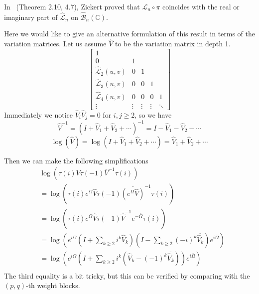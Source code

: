 In~\cite{Zickert_HolomorphicPolylogarithmsAndBlochComplexes} (Theorem 2.10, 4.7), Zickert proved that $\mathcal L_{n}\circ\pi$ coincides with the real or imaginary part of $\widehat{\mathcal L}_n$ on $\widehat{\mathcal B}_n(\mathbb C)$.

Here we would like to give an alternative formulation of this result in terms of the variation matrices. Let us assume $\widehat V$ to be the variation matrix in depth 1.
\begin{equation}
\begin{bmatrix}
1\\
0&1\\
\widehat{\mathcal L}_2(u,v)&0&1\\
\widehat{\mathcal L}_3(u,v)&0&0&1\\
\widehat{\mathcal L}_4(u,v)&0&0&0&1\\
\vdots&\vdots&\vdots&\vdots&\ddots
\end{bmatrix}
\end{equation}
Immediately we notice $\widehat V_i\widehat V_j=0$ for $i,j\geq2$, so we have
\[
\widehat V^{-1}=(I+\widehat V_1+\widehat V_2+\cdots)^{-1}=I-\widehat V_1-\widehat V_2-\cdots
\]
\[
\log(\widehat V)=\log(I+\widehat V_1+\widehat V_2+\cdots)=\widehat V_1+\widehat V_2+\cdots
\]

Then we can make the following simplifications
\begin{equation}\label{eq: simplification of regulator}
\begin{aligned}
&\log\left(\tau(i)V\tau(-1)\overline V^{-1}\tau(i)\right)\\
&=\log\left(\tau(i)e^\Omega\widehat V\tau(-1)\overline{(e^\Omega\widehat V)}^{-1}\tau(i)\right) \\
&=\log\left(\tau(i)e^\Omega\widehat V\tau(-1)\overline{\widehat V}^{-1}e^{-\overline\Omega}\tau(i)\right) \\
&=\log\left(e^{i\Omega}\left(I+\sum_{k\geq2}i^k\widehat V_k\right)\left(I-\sum_{k\geq2}(-i)^k\overline{\widehat V_k}\right)e^{i\overline\Omega}\right) \\
&=\log\left(e^{i\Omega}\left(I+\sum_{k\geq2}i^k\left(\widehat V_k-(-1)^{k}\overline{\widehat V_k}\right)\right)e^{i\overline\Omega}\right) \\
\end{aligned}
\end{equation}
The third equality is a bit tricky, but this can be verified by comparing with the $(p,q)$-th weight blocks. 


